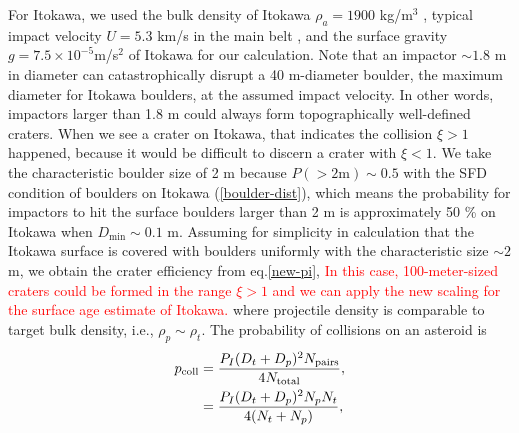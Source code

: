 \documentclass[3p,authoryear]{elsarticle}
\newcommand{\red}[1]{\textcolor{red}{#1}}
\begin{document}
For Itokawa, we used the bulk density of Itokawa $\rho_a=1900$ kg/m$^3$ \citep{fujiwara2006}, typical impact velocity $U=5.3$ km/s in the main belt \citep{bottke1994}, and the surface gravity $g=7.5\times 10^{-5}$m/s$^2$ \citep{tancredi2015} of Itokawa for our calculation.
Note that an impactor $\sim 1.8$ m in diameter can catastrophically disrupt a 40 m-diameter boulder, the maximum diameter for Itokawa boulders, at the assumed impact velocity.
In other words, impactors larger than 1.8 m could always form topographically well-defined craters.
When we see a crater on Itokawa, that indicates the collision $\xi>1$ happened, because it would be difficult to discern a crater with $\xi<1$.
We take the characteristic boulder size of 2 m because $P(>2 \text{m})\sim 0.5$ with the SFD condition of boulders on Itokawa (\ref{boulder-dist}), which means the probability for impactors to hit the surface boulders larger than 2 m is approximately 50 \% on Itokawa when $D_\text{min} \sim 0.1$ m.
Assuming for simplicity in calculation that the Itokawa surface is covered with boulders uniformly with the characteristic size $\sim2$ m, we obtain the crater efficiency from eq.\eqref{new-pi},
\red{In this case, 100-meter-sized craters could be formed in the range $\xi>1$ and we can apply the new scaling for the surface age estimate of Itokawa.}
where projectile density is comparable to target bulk density, i.e., $\rho_p\sim\rho_t$.
%
%
The probability of collisions on an asteroid is
\begin{align}
	p_\text{coll}&=\frac{P_I(D_t+D_p)^2N_\text{pairs}}{4 N_\text{total}}, \notag\\
	&=\frac{P_I(D_t+D_p)^2N_pN_t}{4(N_t+N_p)},
\end{align}
\end{document}
